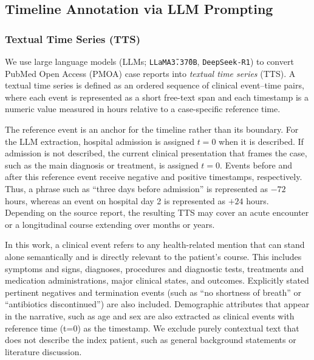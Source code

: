 \documentclass[pdflatex,sn-mathphys-num]{sn-jnl}%
\newif\ifshowrebuttalcolor
\newcommand{\rebuttal}[1]{%
  \ifshowrebuttalcolor
    \textcolor{rebuttalblue}{#1}%
  \else
    #1%
  \fi
}
\theoremstyle{thmstyleone}%
\theoremstyle{thmstyletwo}%
\theoremstyle{thmstylethree}%
\begin{document}

\subsection{Timeline Annotation via LLM Prompting}
\label{sec:timeline-annotation}

\subsubsection{Textual Time Series (TTS)}
\label{sec:textual-time-series}

We use large language models (LLMs; \texttt{LLaMA\~3.3\~70B}, \texttt{DeepSeek-R1}) to convert PubMed Open Access (PMOA) case reports into \emph{textual time series} (TTS). A textual time series is defined as an ordered sequence of clinical event–time pairs, where each event is represented as a short free-text span and each timestamp is a numeric value measured in hours relative to a case-specific reference time.
\rebuttal{
The reference event is an anchor for the timeline rather than its boundary. For the LLM extraction, hospital admission is assigned $t=0$ when it is described. If admission is not described, the current clinical presentation that frames the case, such as the main diagnosis or treatment, is assigned $t=0$. Events before and after this reference event receive negative and positive timestamps, respectively. Thus, a phrase such as ``three days before admission'' is represented as $-72$ hours, whereas an event on hospital day 2 is represented as $+24$ hours. Depending on the source report, the resulting TTS may cover an acute encounter or a longitudinal course extending over months or years.
}

In this work, a clinical event refers to any health-related mention that can stand alone semantically and is directly relevant to the patient’s course. This includes symptoms and signs, diagnoses, procedures and diagnostic tests, treatments and medication administrations, major clinical states, and outcomes. Explicitly stated pertinent negatives and termination events (such as “no shortness of breath” or “antibiotics discontinued”) are also included. 
Demographic attributes that appear in the narrative, such as age and sex are also extracted as clinical events with reference time (t=0) as the timestamp. We exclude purely contextual text that does not describe the index patient, such as general background statements or literature discussion.
\end{document}

